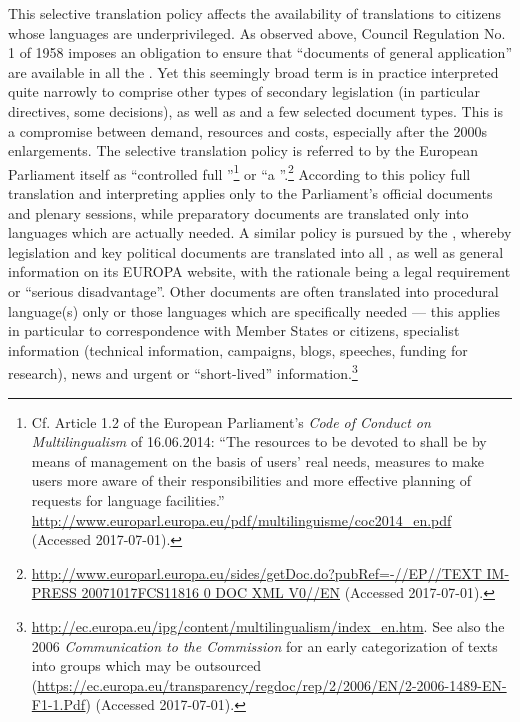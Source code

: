 \documentclass[output=paper]{langsci/langscibook}
\begin{document}
This selective translation policy affects the availability of  translations to citizens whose languages are underprivileged. As observed above, Council Regulation No. 1 of 1958 imposes an obligation to ensure that “documents of general application” are available in all the . Yet this seemingly broad term is in practice interpreted quite narrowly to comprise other types of secondary legislation (in particular directives, some decisions), as well as  and a few selected document types. This is a compromise between demand, resources and costs, especially after the 2000s enlargements. The selective translation policy is referred to by the European Parliament itself as “controlled full ”\footnote{Cf. Article 1.2 of the European Parliament’s \textit{Code of Conduct on Multilingualism} of 16.06.2014: “The resources to be devoted to  shall be  by means of management on the basis of users’ real needs, measures to make users more aware of their responsibilities and more effective planning of requests for language facilities.” \url{http://www.europarl.europa.eu/pdf/multilinguisme/coc2014_en.pdf} (Accessed 2017-07-01).} 
or “a ”.\footnote{\url{http://www.europarl.europa.eu/sides/getDoc.do?pubRef=-//EP//TEXT IM-PRESS 20071017FCS11816 0 DOC XML V0//EN} (Accessed 2017-07-01).} 
According to this policy full translation and interpreting applies only to the Parliament’s official documents and plenary sessions, while preparatory documents are translated only into languages which are actually needed. A similar policy is pursued by the , whereby legislation and key political documents are translated into all  , as well as general information on its EUROPA website, with the rationale being a legal requirement or “serious disadvantage''. Other documents are often translated into procedural language(s) only or those languages which are specifically needed — this applies in particular to correspondence with Member States or citizens, specialist information (technical information, campaigns, blogs, speeches, funding for research), news and urgent or “short-lived'' information.\footnote{\url{http://ec.europa.eu/ipg/content/multilingualism/index_en.htm}. 
See also the 2006 \textit{Communication to the Commission} for an early categorization of texts into groups which may be outsourced (\url{https://ec.europa.eu/transparency/regdoc/rep/2/2006/EN/2-2006-1489-EN-F1-1.Pdf}) (Accessed 2017-07-01).} 
\end{document}
